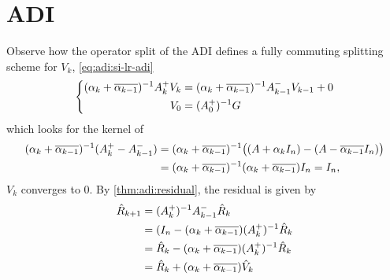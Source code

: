 \section{ADI}

Observe how the operator split of the \ac{ADI} defines a fully commuting splitting scheme for $V_k$,
\cf \eqref{eq:adi:si-lr-adi}
\begin{equation}
\left\{
\begin{aligned}
  (\alpha_k + \conj{\alpha_{k-1}})^{-1} A_k^+ V_k &= (\alpha_k + \conj{\alpha_{k-1}})^{-1} A_{k-1}^- V_{k-1} + 0 \\
  V_0 &= (A_0^+)^{-1} G
\end{aligned}
\right.
\end{equation}
which looks for the kernel of
\begin{align*}
  (\alpha_k + \conj{\alpha_{k-1}})^{-1} (A_k^+ - A_{k-1}^-)
  &= (\alpha_k + \conj{\alpha_{k-1}})^{-1} \big( (A + \alpha_k I_n) - (A - \conj{\alpha_{k-1}} I_n) \big) \\
  &= (\alpha_k + \conj{\alpha_{k-1}})^{-1} (\alpha_k + \conj{\alpha_{k-1}}) I_n
  = I_n
  ,
\end{align*}
\ie $V_k$ converges to $0$.
By \autoref{thm:adi:residual},
the residual is given by
\begin{align*}
  \hat R_{k+1}
  &= (A_k^+)^{-1} A_{k-1}^- \hat R_k \\
  &= (I_n - (\alpha_k + \conj{\alpha_{k-1}}) (A_k^+)^{-1} \hat R_k \\
  &= \hat R_k - (\alpha_k + \conj{\alpha_{k-1}}) (A_k^+)^{-1} \hat R_k \\
  &= \hat R_k + (\alpha_k + \conj{\alpha_{k-1}}) \hat V_k
\end{align*}
